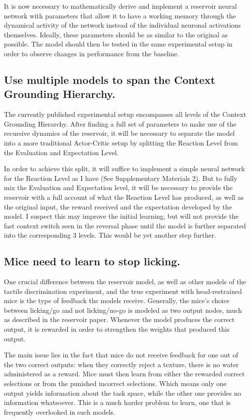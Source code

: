 \documentclass[11pt]{article}
\begin{document}
It is now necessary to mathematically derive and implement a reservoir neural network with parameters that allow it to have a working memory through the dynamical activity of the network instead of the individual neuronal activations themselves.  Ideally, these parameters should be as similar to the original as possible.  The model should then be tested in the same experimental setup in order to observe changes in performance from the baseline.

\subsection{Use multiple models to span the Context Grounding Hierarchy.}
The currently published experimental setup encompasses all levels of the Context Grounding Hierarchy.  After finding a full set of parameters to make use of the recursive dynamics of the reservoir, it will be necessary to separate the model into a more traditional Actor-Critic setup by splitting the Reaction Level from the Evaluation and Expectation Level.

In order to achieve this split, it will suffice to implement a simple neural network for the Reaction Level as I have (See Supplementary Materials 2).  But to fully mix the Evaluation and Expectation level, it will be necessary to provide the reservoir with a full account of what the Reaction Level has produced, as well as the original input, the reward received and the expectation developed by the model.  I suspect this may improve the initial learning, but will not provide the fast context switch seen in the reversal phase until the model is further separated into the corresponding 3 levels.  This would be yet another step further.

\subsection{Mice need to learn to stop licking.}
One crucial difference between the reservoir model, as well as other models of the tactile discrimination experiment, and the true experiment with head-restrained mice is the type of feedback the models receive.  Generally, the mice's choice between licking/go and not licking/no-go is modeled as two output nodes, much as described in the reservoir paper.  Whenever the model produces the correct output, it is rewarded in order to strengthen the weights that produced this output.  

The main issue lies in the fact that mice do not receive feedback for one out of the two correct outputs: when they correctly reject a texture, there is no water administered as a reward.  Mice must then learn from either the rewarded correct selections or from the punished incorrect selections.  Which means only one output yields information about the task space, while the other one provides no information whatsoever.  This is a much harder problem to learn, one that is frequently overlooked in such models.
\end{document}
